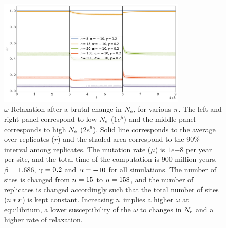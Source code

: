\documentclass{article}
\begin{document}
\begin{figure}[H]
    \centering
    \includegraphics[width=0.8\textwidth] {Relaxation-Stability.pdf}
    \caption[Relaxation time of $\omega$ dependence on $\NbrSites$]{
    $\omega$ Relaxation after a brutal change in $N_{\text{e}}$, for various $\NbrSites$.
    The left and right panel correspond to low $N_{\text{e}}$ ($1e^{5}$) and the middle panel corresponds to high $N_{\text{e}}$ ($2e^{6}$).
    Solid line corresponds to the average over replicates ($r$) and the shaded area correspond to the $90\%$ interval among replicates.
    The mutation rate ($\mu$) is $1e{-8}$ per year per site, and the total time of the computation is $900$ million years.
    $\beta=1.686$, $\gamma=0.2$ and $\alpha=-10$ for all simulations. The number of sites is changed from $n=15$ to $n=158$, and the number of replicates is changed accordingly such that the total number of sites ($n*r$) is kept constant.
    Increasing $\NbrSites$ implies a higher $\omega$ at equilibrium, a lower susceptibility of the $\omega$ to changes in $N_{\text{e}}$ and a higher rate of relaxation.
    }
\end{figure}
\end{document}
